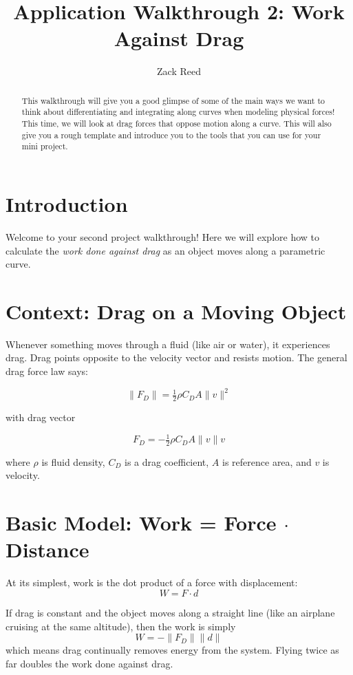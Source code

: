 \documentclass{ximera}
\title{Application Walkthrough 2: Work Against Drag}
\author{Zack Reed}
\begin{document}
\begin{abstract}
This walkthrough will give you a good glimpse of some of the main ways we want to think about differentiating and integrating along curves when modeling physical forces! This time, we will look at drag forces that oppose motion along a curve. This will also give you a rough template and introduce you to the tools that you can use for your mini project.
\end{abstract}
\maketitle

\section*{Introduction}

Welcome to your second project walkthrough! Here we will explore how to calculate the \emph{work done against drag} as an object moves along a parametric curve.

\section*{Context: Drag on a Moving Object}

Whenever something moves through a fluid (like air or water), it experiences drag. Drag points opposite to the velocity vector and resists motion. The general drag force law says:

$$
\|F_D\| = \tfrac{1}{2}\rho C_D A \|v\|^2
$$

with drag vector

$$
F_D = -\tfrac{1}{2}\rho C_D A \|v\| v
$$

where $\rho$ is fluid density, $C_D$ is a drag coefficient, $A$ is reference area, and $v$ is velocity.

\section*{Basic Model: Work = Force $\cdot$ Distance}

At its simplest, work is the dot product of a force with displacement:
$$
W = F \cdot d
$$

If drag is constant and the object moves along a straight line (like an airplane cruising at the same altitude), then the work is simply
$$
W = -\|F_D\|\|d\|
$$
which means drag continually removes energy from the system. Flying twice as far doubles the work done against drag.
\end{document}
